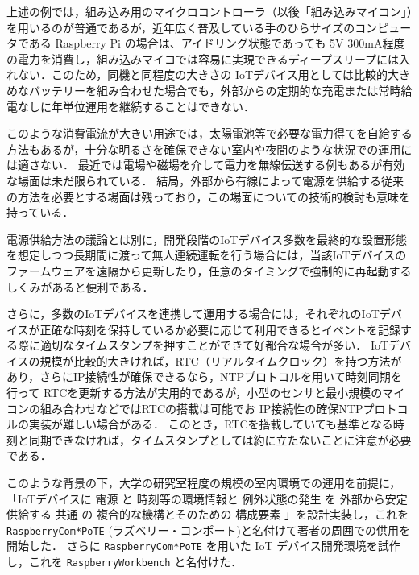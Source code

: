 上述の例では，組み込み用のマイクロコントローラ（以後「組み込みマイコン」）を用いるのが普通であるが，近年広く普及している手のひらサイズのコンピュータである Raspberry Pi の場合は、アイドリング状態であっても 5V 300mA程度の電力を消費し，組み込みマイコでは容易に実現できるディープスリープには入れない．このため，同機と同程度の大きさの IoTデバイス用としては比較的大きめなバッテリーを組み合わせた場合でも，外部からの定期的な充電または常時給電なしに年単位運用を継続することはできない．

このような消費電流が大きい用途では，太陽電池等で必要な電力得てを自給する方法もあるが，十分な明るさを確保できない室内や夜間のような状況での運用には適さない．
最近では電場や磁場を介して電力を無線伝送する例もあるが有効な場面は未だ限られている．
結局，外部から有線によって電源を供給する従来の方法を必要とする場面は残っており，この場面についての技術的検討も意味を持っている．

電源供給方法の議論とは別に，開発段階のIoTデバイス多数を最終的な設置形態を想定しつつ長期間に渡って無人連続運転を行う場合には，当該IoTデバイスのファームウェアを遠隔から更新したり，任意のタイミングで強制的に再起動するしくみがあると便利である．

さらに，多数のIoTデバイスを連携して運用する場合には，それぞれのIoTデバイスが正確な時刻を保持しているか必要に応じて利用できるとイベントを記録する際に適切なタイムスタンプを押すことができて好都合な場合が多い．
IoTデバイスの規模が比較的大きければ，RTC（リアルタイムクロック）を持つ方法があり，さらにIP接続性が確保できるなら，NTPプロトコルを用いて時刻同期を行って
RTCを更新する方法が実用的であるが，小型のセンサと最小規模のマイコンの組み合わせなどではRTCの搭載は可能でお IP接続性の確保NTPプロトコルの実装が難しい場合がある．
このとき，RTCを搭載していても基準となる時刻と同期できなければ，タイムスタンプとしては約に立たないことに注意が必要である．

このような背景の下，大学の研究室程度の規模の室内環境での運用を前提に，
「IoTデバイスに
電源 と
時刻等の環境情報と
例外状態の発生 を
外部から安定供給する
共通 の
複合的な機構とそのための
構成要素
」を設計実装し，これを
{\tt Raspberry\underline{Com*PoTE}}
(ラズベリー・コンポート)と名付けて著者の周囲での供用を開始した．
さらに {\tt Raspberry\-Com*PoTE} を用いた IoT デバイス開発環境を試作し，これを
{\tt RaspberryWorkbench}
と名付けた．

